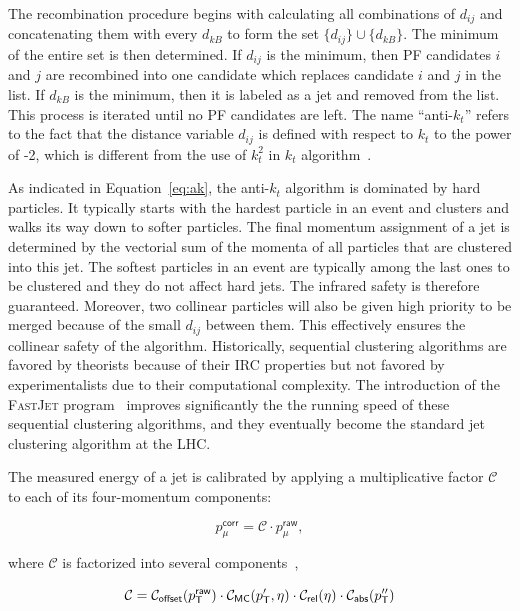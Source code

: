 The recombination procedure begins with calculating all combinations of $d_{ij}$ and concatenating them with every $d_{kB}$ to form the set $\{d_{ij}\}\cup\{d_{kB}\}$. The minimum of the entire set is then determined. If $d_{ij}$ is the minimum, then \ac{PF} candidates $i$ and $j$ are recombined into one candidate which replaces candidate $i$ and $j$ in the list. If $d_{kB}$ is the minimum, then it is labeled as a jet and removed from the list. This process is iterated until no \ac{PF} candidates are left. The name ``anti-$k_t$'' refers to the fact that the distance variable $d_{ij}$ is defined with respect to $k_t$ to the power of -2, which is different from the use of $k_t^2$ in $k_t$ algorithm~\cite{Ellis:1993tq}. 

As indicated in Equation~\ref{eq:ak}, the anti-$k_t$ algorithm is dominated by hard particles. It typically starts with the hardest particle in an event and clusters and walks its way down to softer particles. The final momentum assignment of a jet is determined by the vectorial sum of the momenta of all particles that are clustered into this jet. The softest particles in an event are typically among the last ones to be clustered and they do not affect hard jets. The infrared safety is therefore guaranteed. Moreover, two collinear particles will also be given high priority to be merged because of the small $d_{ij}$ between them. This effectively ensures the collinear safety of the algorithm. Historically, sequential clustering algorithms are favored by theorists because of their \ac{IRC} properties but not favored by experimentalists due to their computational complexity. The introduction of the \textsc{FastJet} program~\cite{Cacciari:2011ma} improves significantly the the running speed of these sequential clustering algorithms, and they eventually become the standard jet clustering algorithm at the \ac{LHC}.

The measured energy of a jet is calibrated by applying a multiplicative factor $\mathcal{C}$ to each of its four-momentum components:

\begin{equation}
p^{\textsf{corr}}_{\mu} = \mathcal{C}\cdot p^{\textsf{raw}}_{\mu},
\end{equation}

where $\mathcal{C}$ is factorized into several components~\cite{CMS:2011shu},

\begin{equation}
\mathcal{C} = \mathcal{C}_{\textsf{offset}}(p_{\textsf{T}}^{\textsf{raw}})\cdot\mathcal{C}_{\textsf{MC}}(p_{\textsf{T}}^{\prime},\eta)\cdot\mathcal{C}_{\textsf{rel}}(\eta)\cdot\mathcal{C}_{\textsf{abs}}(p_{\textsf{T}}^{\prime\prime})
\end{equation}

